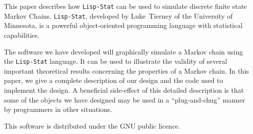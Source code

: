 This paper describes how {\tt Lisp-Stat} can be used to simulate discrete 
finite state Markov Chains.  {\tt Lisp-Stat},  developed by
Luke~Tierney of the University of Minnesota,  is a powerful
object-oriented programming language with statistical capabilities. 

The software we have developed will graphically simulate a Markov
chain using the {\tt Lisp-Stat} language.  It can be used to
illustrate the validity of several important theoretical results
concerning the properties of a Markov chain.  In this paper, we
give a complete description of our design and the code used to
implement the design.  A beneficial side-effect of this detailed
description is that some of the objects we have designed may be used
in a ``plug-and-chug'' manner by programmers in other situations. 

This software is distributed under the GNU public licence. 


